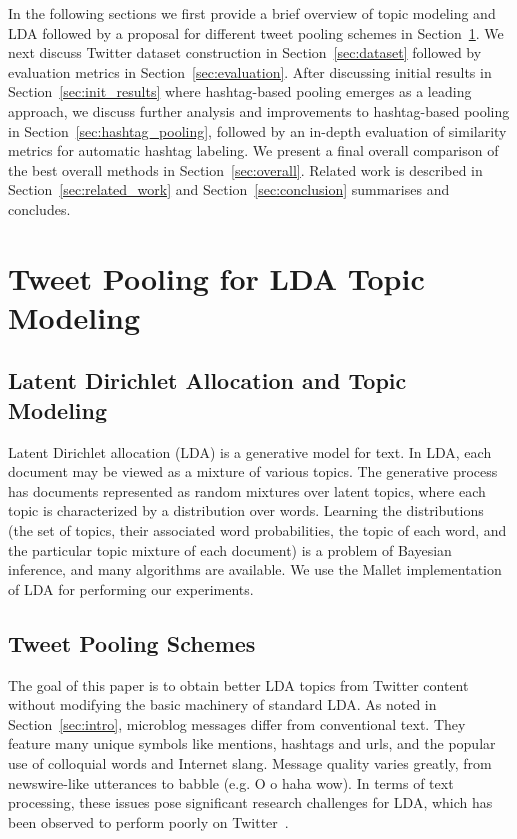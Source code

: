 \documentclass{sig-alternate}
\begin{document}
In the following sections we first provide a brief overview of topic
modeling and LDA followed by a proposal for different tweet pooling
schemes in Section~\ref{sec:pooling}.  We next discuss Twitter dataset
construction in Section~\ref{sec:dataset} followed by evaluation
metrics in Section~\ref{sec:evaluation}. After discussing initial
results in Section~\ref{sec:init_results} where hashtag-based pooling
emerges as a leading approach, we discuss further analysis and
improvements to hashtag-based pooling in Section~\ref{sec:hashtag_pooling}, followed by an in-depth evaluation of similarity metrics for automatic hashtag labeling.  We present a
final overall comparison of the best overall methods in
Section~\ref{sec:overall}.  Related work is described in
Section~\ref{sec:related_work} and Section~\ref{sec:conclusion}
summarises and concludes.


\section{Tweet Pooling for LDA Topic Modeling}

\label{sec:pooling}

\subsection{Latent Dirichlet Allocation and Topic Modeling}

\label{subsec:lda}

Latent Dirichlet allocation (LDA) \cite{blei03} is a generative model
for text. In LDA, each document may be viewed as a mixture of various
topics.  The generative process has documents 
represented as random mixtures over latent topics, where each topic is
characterized by a distribution over words.  Learning the 
distributions (the set of topics, their associated word probabilities,
the topic of each word, and the particular topic mixture of each
document) is a problem of Bayesian inference, and many algorithms are
available.  We use the Mallet \cite{mallet} implementation of LDA for
performing our experiments.

\subsection{Tweet Pooling Schemes}

The goal of this paper is to obtain better LDA topics from Twitter
content without modifying the basic machinery of standard LDA.  As
noted in Section~\ref{sec:intro}, microblog messages differ from
conventional text. They feature many unique symbols like mentions,
hashtags and urls, and the popular use of colloquial words and
Internet slang. Message quality varies greatly, from newswire-like
utterances to babble (e.g. O o haha wow). In terms of text processing,
these issues pose significant research challenges for LDA, which has
been observed to perform poorly on Twitter~\cite{wayne}.
\end{document}
